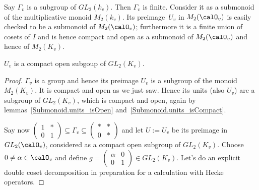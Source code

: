 Say $\Gamma_v$ is a subgroup of $GL_2(k_v)$. Then $\Gamma_v$ is finite. Consider it as a submonoid of
the multiplicative monoid $M_2(k_v)$. Its preimage~$U_v$ in $M_2(\calO_v)$
is easily checked to be a submonoid of $M_2(\calO_v)$; furthermore it is a finite union of
cosets of $I$ and is hence compact and open as a submonoid of $M_2(\calO_v)$ and hence of $M_2(K_v)$.

\begin{lemma}
  \label{nolean-compactopen-U1p} $U_v$ is a compact open subgoup of $GL_2(K_v)$.
\end{lemma}
\begin{proof}
  $\Gamma_v$ is a group and hence its preimage $U_v$ is a subgroup of the monoid
  $M_2(K_v)$. It is compact and open as we just saw. Hence its units (also $U_v$)
  are a subgroup of $GL_2(K_v)$, which is compact and open, again by
  lemmas~\ref{Submonoid.units_isOpen} and~\ref{Submonoid.units_isCompact}.

Say now $\begin{pmatrix}1&*\\0&1\end{pmatrix}\subseteq\Gamma_v\subseteq\begin{pmatrix}*&*\\0&*\end{pmatrix}$
and let $U:=U_v$ be its preimage in $GL_2(\calO_v)$, considered as a compact open subgroup of $GL_2(K_v)$.
Choose $0\not=\alpha\in\calO_v$ and define $g=\begin{pmatrix}\alpha&0\\0&1\end{pmatrix}\in GL_2(K_v)$.
Let's do an explicit double coset decomposition in preparation for a calculation with Hecke operators.


\end{proof}
